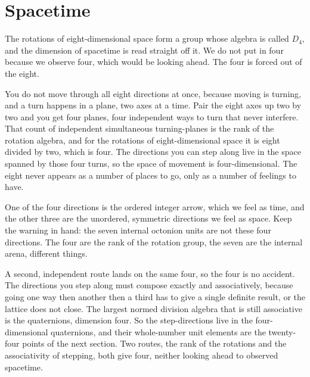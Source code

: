 \section{Spacetime}

The rotations of eight-dimensional space form a group whose algebra is called $D_4$, and the dimension of spacetime is read straight off it. We do not put in four because we observe four, which would be looking ahead. The four is forced out of the eight.

You do not move through all eight directions at once, because moving is turning, and a turn happens in a plane, two axes at a time. Pair the eight axes up two by two and you get four planes, four independent ways to turn that never interfere. That count of independent simultaneous turning-planes is the rank of the rotation algebra, and for the rotations of eight-dimensional space it is eight divided by two, which is four. The directions you can step along live in the space spanned by those four turns, so the space of movement is four-dimensional. The eight never appears as a number of places to go, only as a number of feelings to have.

One of the four directions is the ordered integer arrow, which we feel as time, and the other three are the unordered, symmetric directions we feel as space. Keep the warning in hand: the seven internal octonion units are not these four directions. The four are the rank of the rotation group, the seven are the internal arena, different things.

A second, independent route lands on the same four, so the four is no accident. The directions you step along must compose exactly and associatively, because going one way then another then a third has to give a single definite result, or the lattice does not close. The largest normed division algebra that is still associative is the quaternions, dimension four. So the step-directions live in the four-dimensional quaternions, and their whole-number unit elements are the twenty-four points of the next section. Two routes, the rank of the rotations and the associativity of stepping, both give four, neither looking ahead to observed spacetime.
